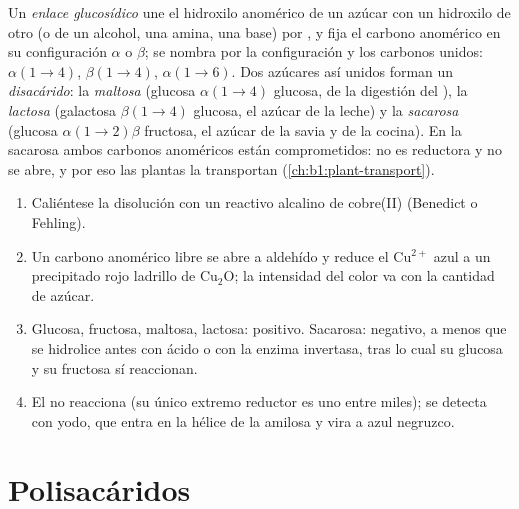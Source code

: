 \begin{definition}\label{def:b1:carbohydrates:glycosidic}
Un \emph{enlace glucosídico} une el hidroxilo
anomérico de un azúcar con un hidroxilo de otro (o de un alcohol, una amina,
una base) por , y fija el carbono anomérico en su configuración
$\alpha$ o $\beta$; se nombra por la configuración y los carbonos unidos:
$\alpha(1{\to}4)$, $\beta(1{\to}4)$, $\alpha(1{\to}6)$. Dos azúcares así
unidos forman un \emph{disacárido}: la \emph{maltosa}
(glucosa $\alpha(1{\to}4)$ glucosa, de la digestión del ), la
\emph{lactosa} (galactosa $\beta(1{\to}4)$ glucosa, el azúcar de la leche) y
la \emph{sacarosa} (glucosa $\alpha(1{\to}2)\beta$ fructosa, el azúcar de la
savia y de la cocina). En la sacarosa ambos carbonos anoméricos están
comprometidos: no es reductora y no se abre, y por eso las plantas la
transportan (\cref{ch:b1:plant-transport}).
\end{definition}

\begin{method}\label{met:b1:carbohydrates:reducing}
\begin{enumerate}
  \item Caliéntese la disolución con un reactivo alcalino de cobre(II)
        (Benedict o Fehling).
  \item Un carbono anomérico libre se abre a aldehído y reduce el
        $\mathrm{Cu^{2+}}$ azul a un precipitado rojo ladrillo de
        $\mathrm{Cu_2O}$; la intensidad del color va con la cantidad de
        azúcar.
  \item Glucosa, fructosa, maltosa, lactosa: positivo. Sacarosa: negativo,
        a menos que se hidrolice antes con ácido o con la enzima invertasa,
        tras lo cual su glucosa y su fructosa sí reaccionan.
  \item El  no reacciona (su único extremo reductor es uno entre
        miles); se detecta con yodo, que entra en la hélice de la amilosa y
        vira a azul negruzco.
\end{enumerate}
\end{method}

\section{Polisacáridos}

